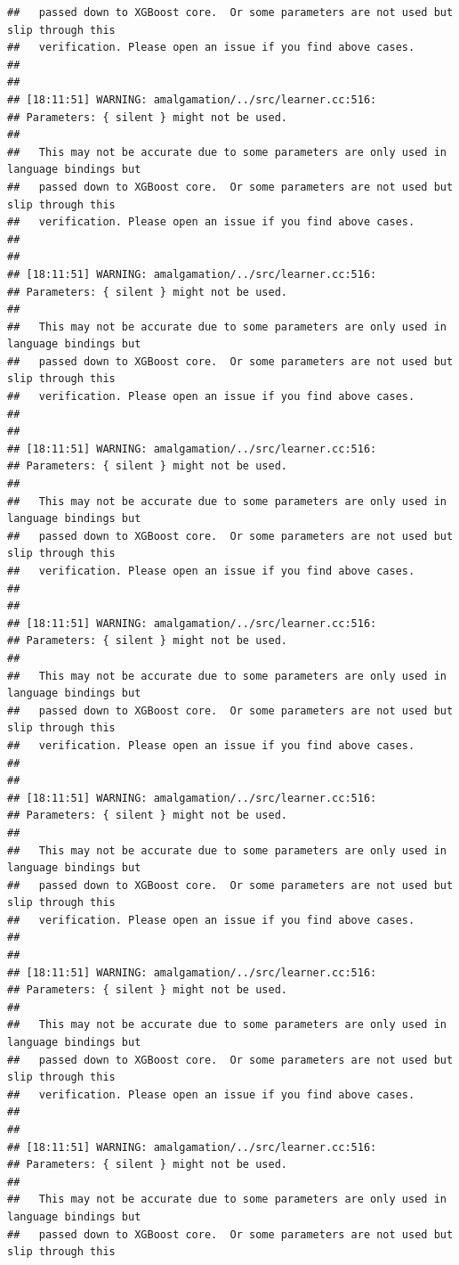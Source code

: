 \documentclass[AMS,STIX2COL]{WileyNJD-v2}\usepackage[]{graphicx}\usepackage[]{color}
\makeatletter
\newenvironment{kframe}{%
 \def\at@end@of@kframe{}%
 \ifinner\ifhmode%
  \def\at@end@of@kframe{\end{minipage}}%
  \begin{minipage}{\columnwidth}%
 \fi\fi%
 \def\FrameCommand##1{\hskip\@totalleftmargin \hskip-\fboxsep
 \colorbox{shadecolor}{##1}\hskip-\fboxsep
     \hskip-\linewidth \hskip-\@totalleftmargin \hskip\columnwidth}%
 \MakeFramed {\advance\hsize-\width
   \@totalleftmargin\z@ \linewidth\hsize
   \@setminipage}}%
 {\par\unskip\endMakeFramed%
 \at@end@of@kframe}
\newenvironment{knitrout}{}{} %
\makeatother
\begin{document}
\begin{knitrout}
\begin{kframe}
\begin{verbatim}
##   passed down to XGBoost core.  Or some parameters are not used but slip through this
##   verification. Please open an issue if you find above cases.
## 
## 
## [18:11:51] WARNING: amalgamation/../src/learner.cc:516: 
## Parameters: { silent } might not be used.
## 
##   This may not be accurate due to some parameters are only used in language bindings but
##   passed down to XGBoost core.  Or some parameters are not used but slip through this
##   verification. Please open an issue if you find above cases.
## 
## 
## [18:11:51] WARNING: amalgamation/../src/learner.cc:516: 
## Parameters: { silent } might not be used.
## 
##   This may not be accurate due to some parameters are only used in language bindings but
##   passed down to XGBoost core.  Or some parameters are not used but slip through this
##   verification. Please open an issue if you find above cases.
## 
## 
## [18:11:51] WARNING: amalgamation/../src/learner.cc:516: 
## Parameters: { silent } might not be used.
## 
##   This may not be accurate due to some parameters are only used in language bindings but
##   passed down to XGBoost core.  Or some parameters are not used but slip through this
##   verification. Please open an issue if you find above cases.
## 
## 
## [18:11:51] WARNING: amalgamation/../src/learner.cc:516: 
## Parameters: { silent } might not be used.
## 
##   This may not be accurate due to some parameters are only used in language bindings but
##   passed down to XGBoost core.  Or some parameters are not used but slip through this
##   verification. Please open an issue if you find above cases.
## 
## 
## [18:11:51] WARNING: amalgamation/../src/learner.cc:516: 
## Parameters: { silent } might not be used.
## 
##   This may not be accurate due to some parameters are only used in language bindings but
##   passed down to XGBoost core.  Or some parameters are not used but slip through this
##   verification. Please open an issue if you find above cases.
## 
## 
## [18:11:51] WARNING: amalgamation/../src/learner.cc:516: 
## Parameters: { silent } might not be used.
## 
##   This may not be accurate due to some parameters are only used in language bindings but
##   passed down to XGBoost core.  Or some parameters are not used but slip through this
##   verification. Please open an issue if you find above cases.
## 
## 
## [18:11:51] WARNING: amalgamation/../src/learner.cc:516: 
## Parameters: { silent } might not be used.
## 
##   This may not be accurate due to some parameters are only used in language bindings but
##   passed down to XGBoost core.  Or some parameters are not used but slip through this

\end{verbatim}
\end{kframe}
\end{knitrout}
\end{document}
